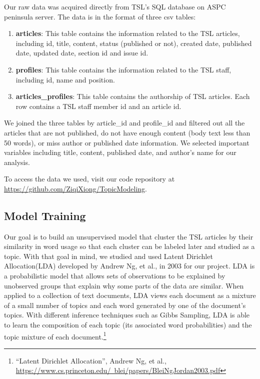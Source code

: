 \documentclass[a4paper]{article}
\begin{document}
Our raw data was acquired directly from TSL's SQL database on ASPC peninsula server. The data is in the format of three csv tables: 

\begin{enumerate}
\item \textbf{articles}: This table contains the information related to the TSL articles, including id, title, content, status (published or not), created date, published date, updated date, section id and issue id.
\item \textbf{profiles}: This table contains the information related to the TSL staff, including id, name and position.
\item \textbf{articles\_profiles}: This table contains the authorship of TSL articles. Each row contains a TSL staff member id and an article id.
\end{enumerate}

We joined the three tables by article\_id and profile\_id and filtered out all the articles that are not published, do not have enough content (body text less than 50 words), or miss author or published date information. We selected important variables including title, content, published date, and author's name for our analysis.

To access the data we used, visit our code repository at \href{https://github.com/ZiqiXiong/TopicModeling}{https://github.com/ZiqiXiong/TopicModeling}.

\subsection{Model Training}

Our goal is to build an unsupervised model that cluster the TSL articles by their similarity in word usage so that each cluster can be labeled later and studied as a topic. With that goal in mind, we studied and used Latent Dirichlet Allocation(LDA) developed by Andrew Ng, et al., in 2003 for our project. LDA is a probabilistic model that allows sets of observations to be explained by unobserved groups that explain why some parts of the data are similar. When applied to a collection of text documents, LDA views each document as a mixture of a small number of topics and each word generated by one of the document's topics. With different inference techniques such as Gibbs Sampling, LDA is able to learn the composition of each topic (its associated word probabilities) and the topic mixture of each document.\footnote{``Latent Dirichlet Allocation'', Andrew Ng, et al., \href{https://www.cs.princeton.edu/~blei/papers/BleiNgJordan2003.pdf}{https://www.cs.princeton.edu/~blei/papers/BleiNgJordan2003.pdf}}
\end{document}
